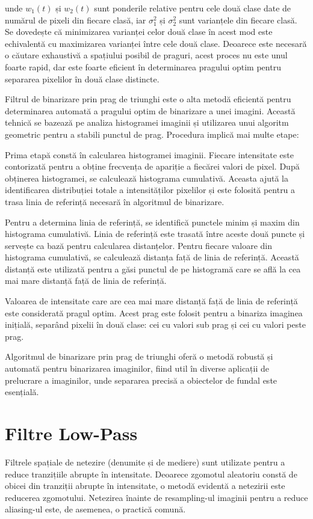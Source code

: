 \documentclass[a4paper,12pt]{report}
\begin{document}
unde \( w_1(t) \) și \( w_2(t) \) sunt ponderile relative pentru cele două clase date de numărul de pixeli din fiecare clasă, iar \( \sigma_1^2 \) și \( \sigma_2^2 \) sunt varianțele din fiecare clasă. Se dovedește că minimizarea varianței celor două clase în acest mod este echivalentă cu maximizarea varianței între cele două clase. Deoarece este necesară o căutare exhaustivă a spațiului posibil de praguri, acest proces nu este unul foarte rapid, dar este foarte eficient în determinarea pragului optim pentru separarea pixelilor în două clase distincte.

Filtrul de binarizare prin prag de triunghi este o alta metodă eficientă pentru determinarea automată a pragului optim de binarizare a unei imagini. Această tehnică se bazează pe analiza histogramei imaginii și utilizarea unui algoritm geometric pentru a stabili punctul de prag. Procedura implică mai multe etape:

Prima etapă constă în calcularea histogramei imaginii. Fiecare intensitate este contorizată pentru a obține frecvența de apariție a fiecărei valori de pixel. După obținerea histogramei, se calculează histograma cumulativă. Aceasta ajută la identificarea distribuției totale a intensităților pixelilor și este folosită pentru a trasa linia de referință necesară în algoritmul de binarizare.

Pentru a determina linia de referință, se identifică punctele minim și maxim din histograma cumulativă. Linia de referință este trasată între aceste două puncte și servește ca bază pentru calcularea distanțelor. Pentru fiecare valoare din histograma cumulativă, se calculează distanța față de linia de referință. Această distanță este utilizată pentru a găsi punctul de pe histogramă care se află la cea mai mare distanță față de linia de referință.

Valoarea de intensitate care are cea mai mare distanță față de linia de referință este considerată pragul optim. Acest prag este folosit pentru a binariza imaginea inițială, separând pixelii în două clase: cei cu valori sub prag și cei cu valori peste prag.

Algoritmul de binarizare prin prag de triunghi oferă o metodă robustă și automată pentru binarizarea imaginilor, fiind util în diverse aplicații de prelucrare a imaginilor, unde separarea precisă a obiectelor de fundal este esențială.

\section{Filtre Low-Pass}
Filtrele spațiale de netezire (denumite și de mediere) sunt utilizate pentru a reduce tranzițiile abrupte în intensitate. Deoarece zgomotul aleatoriu constă de obicei din tranziții abrupte în intensitate, o metodă evidentă a netezirii este reducerea zgomotului. Netezirea înainte de resampling-ul imaginii pentru a reduce aliasing-ul este, de asemenea, o practică comună.
\end{document}
